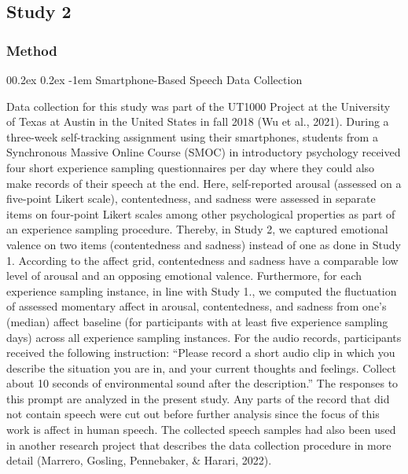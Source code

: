 \documentclass[
  man,floatsintext]{apa6}
\makeatletter
\let\oldparagraph\paragraph
\renewcommand{\paragraph}[1]{\oldparagraph{#1}\mbox{}}
\renewcommand{\paragraph}{\@startsection{paragraph}{4}{\parindent}%
  {0\baselineskip \@plus 0.2ex \@minus 0.2ex}%
  {-1em}%
  {\normalfont\normalsize\bfseries\itshape\typesectitle}}
\makeatother
\begin{document}
\newpage

\hypertarget{study-2}{%
\subsection{Study 2}\label{study-2}}

\hypertarget{method-1}{%
\subsubsection{Method}\label{method-1}}

\hypertarget{smartphone-based-speech-data-collection}{%
\paragraph{Smartphone-Based Speech Data Collection}\label{smartphone-based-speech-data-collection}}

Data collection for this study was part of the UT1000 Project at the University of Texas at Austin in the United States in fall 2018 (Wu et al., 2021). During a three-week self-tracking assignment using their smartphones, students from a Synchronous Massive Online Course (SMOC) in introductory psychology received four short experience sampling questionnaires per day where they could also make records of their speech at the end. Here, self-reported arousal (assessed on a five-point Likert scale), contentedness, and sadness were assessed in separate items on four-point Likert scales among other psychological properties as part of an experience sampling procedure. Thereby, in Study 2, we captured emotional valence on two items (contentedness and sadness) instead of one as done in Study 1. According to the affect grid, contentedness and sadness have a comparable low level of arousal and an opposing emotional valence. Furthermore, for each experience sampling instance, in line with Study 1., we computed the fluctuation of assessed momentary affect in arousal, contentedness, and sadness from one's (median) affect baseline (for participants with at least five experience sampling days) across all experience sampling instances.
For the audio records, participants received the following instruction: ``Please record a short audio clip in which you describe the situation you are in, and your current thoughts and feelings. Collect about 10 seconds of environmental sound after the description.'' The responses to this prompt are analyzed in the present study. Any parts of the record that did not contain speech were cut out before further analysis since the focus of this work is affect in human speech. The collected speech samples had also been used in another research project that describes the data collection procedure in more detail (Marrero, Gosling, Pennebaker, \& Harari, 2022).
\end{document}
